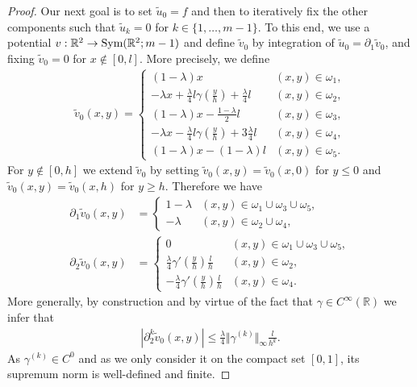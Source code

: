 \documentclass[a4paper, 10pt, twoside, notitlepage]{amsart}
\theoremstyle{plain}
\newcommand{\R}{\mathbb{R}}
\newcommand{\p}{\partial}
\begin{document}
\begin{proof}
			Our next goal is to set $\tilde{u}_0 = f$ and then to iteratively fix the other components such that $\tilde{u}_k = 0$ for $k\in \{1,\dots,m-1\}$.  To this end, we use a potential
			$v: \R^2 \to \textup{Sym}(\R^2;m-1)$ and define $\tilde{v}_0$ by integration of $\tilde{u}_0 = \p_1 \tilde{v}_0$, and fixing $\tilde{v}_0 = 0$ for $x\notin [0,l]$.  More precisely, we define
			\begin{align*}
				\tilde{v}_0(x,y) = \begin{cases}
					(1-\lambda)x & (x,y) \in \omega_1, \\
					- \lambda x + \frac{\lambda}{4}l \gamma(\frac{y}{h}) + \frac{\lambda}{4}l & (x,y) \in \omega_2, \\
					(1-\lambda)x - \frac{1-\lambda}{2} l & (x,y) \in \omega_3, \\
					-\lambda x - \frac{\lambda}{4}l \gamma(\frac{y}{h}) + 3 \frac{\lambda}{4}l& (x,y) \in \omega_4, \\
					(1-\lambda)x - (1-\lambda) l & (x,y) \in \omega_5.
				\end{cases}
			\end{align*}
                        For $y \notin [0,h]$ we extend $\tilde{v}_0$ by setting $\tilde{v}_0(x,y) = \tilde{v}_0(x,0)$ for $y \leq 0$ and $\tilde{v}_0(x,y) = \tilde{v}_0(x,h)$ for $y \geq h$.
			Therefore we have
			\begin{align*}
				\p_1 \tilde{v}_0(x,y) & = \begin{cases} 1-\lambda & (x,y) \in \omega_1 \cup \omega_3 \cup \omega_5, \\ - \lambda & (x,y) \in \omega_2 \cup \omega_4, \end{cases}\\
				\p_2 \tilde{v}_0(x,y) & = \begin{cases} 0 & (x,y) \in \omega_1 \cup \omega_3 \cup \omega_5, \\ \frac{\lambda}{4} \gamma'(\frac{y}{h}) \frac{l}{h} & (x,y) \in \omega_2, \\ -\frac{\lambda}{4} \gamma'(\frac{y}{h}) \frac{l}{h} & (x,y) \in \omega_4. \end{cases}
			\end{align*}
			More generally, by construction and by virtue of the fact that $\gamma \in C^\infty(\R)$ we infer that
			\begin{align} \label{eq:BoundDerivative} | \p_2^k \tilde{v}_0(x,y)| \leq \frac{\lambda}{4} \Vert \gamma^{(k)} \Vert_\infty \frac{l}{h^k}.
			\end{align}
			As $\gamma^{(k)} \in C^0$ and as we only consider it on the compact set $[0,1]$, its supremum norm is well-defined and finite.
			

\end{proof}
\end{document}
